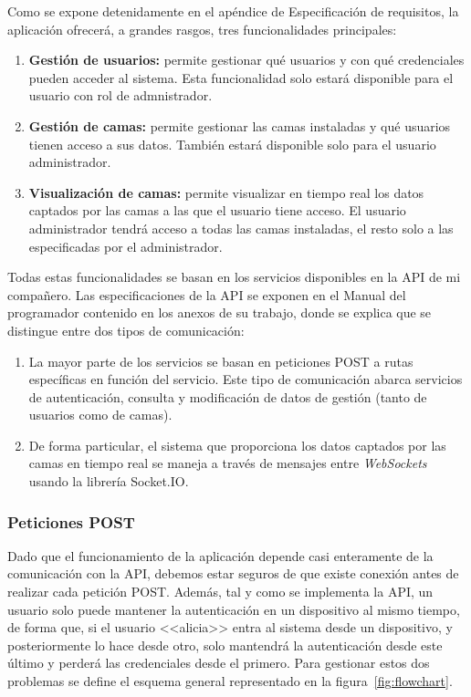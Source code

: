 Como se expone detenidamente en el apéndice de Especificación de requisitos, la aplicación ofrecerá, a grandes rasgos, tres funcionalidades principales: 

\begin{enumerate}
	\item \textbf{Gestión de usuarios:} permite gestionar qué usuarios y con qué credenciales pueden acceder al sistema. Esta funcionalidad solo estará disponible para el usuario con rol de admnistrador. 
	\item \textbf{Gestión de camas:} permite gestionar las camas instaladas y qué usuarios tienen acceso a sus datos. También estará disponible solo para el usuario administrador. 
	\item \textbf{Visualización de camas:} permite visualizar en tiempo real los datos captados por las camas a las que el usuario tiene acceso. El usuario administrador tendrá acceso a todas las camas instaladas, el resto solo a las especificadas por el administrador. 
\end{enumerate}

Todas estas funcionalidades se basan en los servicios disponibles en la API de mi compañero. Las especificaciones de la API se exponen en el Manual del programador contenido en los anexos de su trabajo, donde se explica que se distingue entre dos tipos de comunicación: 

\begin{enumerate}
	\item La mayor parte de los servicios se basan en peticiones POST a rutas específicas en función del servicio. Este tipo de comunicación abarca servicios de autenticación, consulta y modificación de datos de gestión (tanto de usuarios como de camas). 
	\item De forma particular, el sistema que proporciona los datos captados por las camas en tiempo real se maneja a través de mensajes entre \textit{WebSockets} usando la librería Socket.IO. 
\end{enumerate}

\subsubsection{Peticiones POST}
Dado que el funcionamiento de la aplicación depende casi enteramente de la comunicación con la API, debemos estar seguros de que existe conexión antes de realizar cada petición POST. Además, tal y como se implementa la API, un usuario solo puede mantener la autenticación en un dispositivo al mismo tiempo, de forma que, si el usuario <<alicia>> entra al sistema desde un dispositivo, y posteriormente lo hace desde otro, solo mantendrá la autenticación desde este último y perderá las credenciales desde el primero. Para gestionar estos dos problemas se define el esquema general representado en la figura~\ref{fig:flowchart}.   

